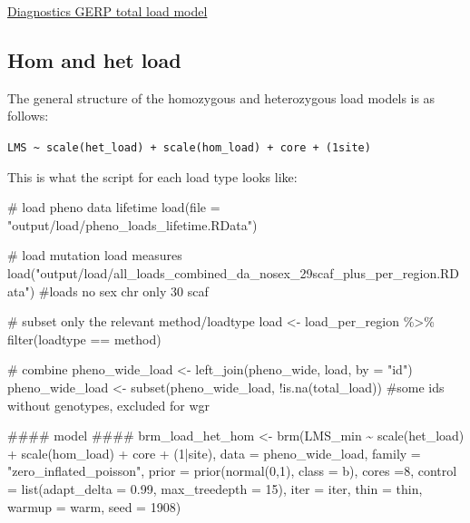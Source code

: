 \documentclass[
  letterpaper,
  DIV=11,
  numbers=noendperiod]{scrreprt}
\newenvironment{Shaded}{}{}
\newcommand{\AttributeTok}[1]{\textcolor[rgb]{0.84,0.23,0.29}{#1}}
\newcommand{\CommentTok}[1]{\textcolor[rgb]{0.42,0.45,0.49}{#1}}
\newcommand{\DecValTok}[1]{\textcolor[rgb]{0.00,0.36,0.77}{#1}}
\newcommand{\DocumentationTok}[1]{\textcolor[rgb]{0.42,0.45,0.49}{#1}}
\newcommand{\FloatTok}[1]{\textcolor[rgb]{0.00,0.36,0.77}{#1}}
\newcommand{\FunctionTok}[1]{\textcolor[rgb]{0.44,0.26,0.76}{#1}}
\newcommand{\NormalTok}[1]{\textcolor[rgb]{0.14,0.16,0.18}{#1}}
\newcommand{\OtherTok}[1]{\textcolor[rgb]{0.44,0.26,0.76}{#1}}
\newcommand{\SpecialCharTok}[1]{\textcolor[rgb]{0.00,0.36,0.77}{#1}}
\newcommand{\StringTok}[1]{\textcolor[rgb]{0.01,0.18,0.38}{#1}}
\begin{document}
\href{https://github.com/rshuhuachen/ms_load_grouse/blob/main/output/models/diagnosis/lms_total_gerp45.pdf}{Diagnostics
GERP total load model}

\subsection{Hom and het load}\label{hom-and-het-load}

The general structure of the homozygous and heterozygous load models is
as follows:

\texttt{LMS\ \textasciitilde{}\ scale(het\_load)\ +\ scale(hom\_load)\ +\ core\ +\ (1\textbar{}site)}

This is what the script for each load type looks like:

\begin{Shaded}
\begin{Highlighting}[]
\CommentTok{\# load pheno data lifetime}
\FunctionTok{load}\NormalTok{(}\AttributeTok{file =} \StringTok{"output/load/pheno\_loads\_lifetime.RData"}\NormalTok{)}

\CommentTok{\# load mutation load measures}
\FunctionTok{load}\NormalTok{(}\StringTok{"output/load/all\_loads\_combined\_da\_nosex\_29scaf\_plus\_per\_region.RData"}\NormalTok{) }\CommentTok{\#loads no sex chr only 30 scaf}

\CommentTok{\# subset only the relevant method/loadtype}
\NormalTok{load }\OtherTok{\textless{}{-}}\NormalTok{ load\_per\_region }\SpecialCharTok{\%\textgreater{}\%} \FunctionTok{filter}\NormalTok{(loadtype }\SpecialCharTok{==}\NormalTok{ method)}

\CommentTok{\# combine}
\NormalTok{pheno\_wide\_load }\OtherTok{\textless{}{-}} \FunctionTok{left\_join}\NormalTok{(pheno\_wide, load, }\AttributeTok{by =} \StringTok{"id"}\NormalTok{)}
\NormalTok{pheno\_wide\_load }\OtherTok{\textless{}{-}} \FunctionTok{subset}\NormalTok{(pheno\_wide\_load, }\SpecialCharTok{!}\FunctionTok{is.na}\NormalTok{(total\_load)) }\CommentTok{\#some ids without genotypes, excluded for wgr}

\DocumentationTok{\#\#\#\# model \#\#\#\#}
\NormalTok{brm\_load\_het\_hom }\OtherTok{\textless{}{-}} \FunctionTok{brm}\NormalTok{(LMS\_min }\SpecialCharTok{\textasciitilde{}} \FunctionTok{scale}\NormalTok{(het\_load) }\SpecialCharTok{+} \FunctionTok{scale}\NormalTok{(hom\_load) }\SpecialCharTok{+}\NormalTok{ core }\SpecialCharTok{+}\NormalTok{ (}\DecValTok{1}\SpecialCharTok{|}\NormalTok{site), }\AttributeTok{data =}\NormalTok{ pheno\_wide\_load,}
                  \AttributeTok{family =} \StringTok{"zero\_inflated\_poisson"}\NormalTok{,}
                  \AttributeTok{prior =} \FunctionTok{prior}\NormalTok{(}\FunctionTok{normal}\NormalTok{(}\DecValTok{0}\NormalTok{,}\DecValTok{1}\NormalTok{), }\AttributeTok{class =}\NormalTok{ b),}
                  \AttributeTok{cores =}\DecValTok{8}\NormalTok{, }\AttributeTok{control =} \FunctionTok{list}\NormalTok{(}\AttributeTok{adapt\_delta =} \FloatTok{0.99}\NormalTok{, }\AttributeTok{max\_treedepth =} \DecValTok{15}\NormalTok{),}
                  \AttributeTok{iter =}\NormalTok{ iter, }\AttributeTok{thin =}\NormalTok{ thin, }\AttributeTok{warmup =}\NormalTok{ warm, }\AttributeTok{seed =} \DecValTok{1908}\NormalTok{)}


\end{Highlighting}
\end{Shaded}
\end{document}
